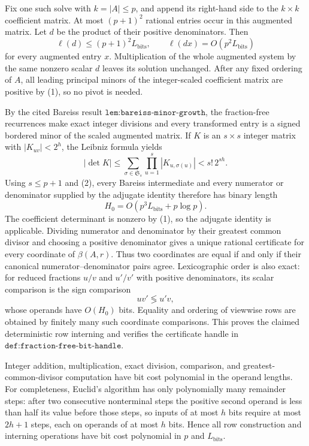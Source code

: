 Fix one such solve with \(k=|A|\leq p\), and append its right-hand side to the \(k\times k\) coefficient matrix.  At most \((p+1)^2\) rational entries occur in this augmented matrix.  Let \(d\) be the product of their positive denominators.  Then
\[
 \ell(d)\leq (p+1)^2L_{\mathrm{bits}},
 \qquad
 \ell(dx)=O(p^2L_{\mathrm{bits}})
\tag{2}
\]
for every augmented entry \(x\).  Multiplication of the whole augmented system by the same nonzero scalar \(d\) leaves its solution unchanged.  After any fixed ordering of \(A\), all leading principal minors of the integer-scaled coefficient matrix are positive by (1), so no pivot is needed.

By the cited Bareiss result \(\texttt{lem:bareiss-minor-growth}\), the fraction-free recurrences make exact integer divisions and every transformed entry is a signed bordered minor of the scaled augmented matrix.  If \(K\) is an \(s\times s\) integer matrix with \(|K_{uv}|<2^h\), the Leibniz formula yields
\[
 |\det K|
 \leq \sum_{\sigma\in\mathfrak S_s}
       \prod_{u=1}^s |K_{u,\sigma(u)}|
 < s!\,2^{sh}.
\tag{3}
\]
Using \(s\leq p+1\) and (2), every Bareiss intermediate and every numerator or denominator supplied by the adjugate identity therefore has binary length
\[
 H_0=O(p^3L_{\mathrm{bits}}+p\log p).
\tag{4}
\]
The coefficient determinant is nonzero by (1), so the adjugate identity is applicable.  Dividing numerator and denominator by their greatest common divisor and choosing a positive denominator gives a unique rational certificate for every coordinate of \(\beta(A,r)\).  Thus two coordinates are equal if and only if their canonical numerator--denominator pairs agree.  Lexicographic order is also exact: for reduced fractions \(u/v\) and \(u'/v'\) with positive denominators, its scalar comparison is the sign comparison
\[
 uv'\mathrel{\lessgtr}u'v,
\]
whose operands have \(O(H_0)\) bits.  Equality and ordering of viewwise rows are obtained by finitely many such coordinate comparisons.  This proves the claimed deterministic row interning and verifies the certificate handle in \(\texttt{def:fraction-free-bit-handle}\).

Integer addition, multiplication, exact division, comparison, and greatest-common-divisor computation have bit cost polynomial in the operand lengths.  For completeness, Euclid's algorithm has only polynomially many remainder steps: after two consecutive nonterminal steps the positive second operand is less than half its value before those steps, so inputs of at most \(h\) bits require at most \(2h+1\) steps, each on operands of at most \(h\) bits.  Hence all row construction and interning operations have bit cost polynomial in \(p\) and \(L_{\mathrm{bits}}\).

